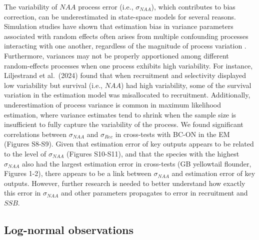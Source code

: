 \documentclass[
  12pt,
]{article}
\begin{document}
The variability of \(NAA\) process error (i.e., \(\sigma_{NAA}\)), which
contributes to bias correction, can be underestimated in state-space
models for several reasons. Simulation studies have shown that
estimation bias in variance parameters associated with random effects
often arises from multiple confounding processes interacting with one
another, regardless of the magnitude of process variation
\citep{Li2024,Liljestrand2024}. Furthermore, variances may not be
properly apportioned among different random-effects processes when one
process exhibits high variability. For instance, Liljestrand et
al.~(2024) found that when recruitment and selectivity displayed low
variability but survival (i.e., \(NAA\)) had high variability, some of
the survival variation in the estimation model was misallocated to
recruitment. Additionally, underestimation of process variance is common
in maximum likelihood estimation, where variance estimates tend to
shrink when the sample size is insufficient to fully capture the
variability of the process. We found significant correlations between
\(\sigma_{NAA}\) and \(\sigma_{Rec}\) in cross-tests with BC-ON in the
EM (Figures S8-S9). Given that estimation error of key outputs appears
to be related to the level of \(\sigma_{NAA}\) (Figures S10-S11), and
that the species with the highest \(\sigma_{NAA}\) also had the largest
estimation error in cross-tests (GB yellowtail flounder, Figures 1-2),
there appears to be a link between \(\sigma_{NAA}\) and estimation error
of key outputs. However, further research is needed to better understand
how exactly this error in \(\sigma_{NAA}\) and other parameters
propagates to error in recruitment and \(SSB\).

\subsection{Log-normal observations}\label{log-normal-observations}
\end{document}
